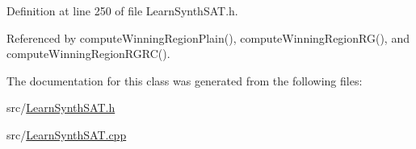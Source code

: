 Definition at line 250 of file Learn\-Synth\-S\-A\-T.\-h.



Referenced by compute\-Winning\-Region\-Plain(), compute\-Winning\-Region\-R\-G(), and compute\-Winning\-Region\-R\-G\-R\-C().



The documentation for this class was generated from the following files\-:\begin{DoxyCompactItemize}
\item 
src/\hyperlink{LearnSynthSAT_8h}{Learn\-Synth\-S\-A\-T.\-h}\item 
src/\hyperlink{LearnSynthSAT_8cpp}{Learn\-Synth\-S\-A\-T.\-cpp}\end{DoxyCompactItemize}
